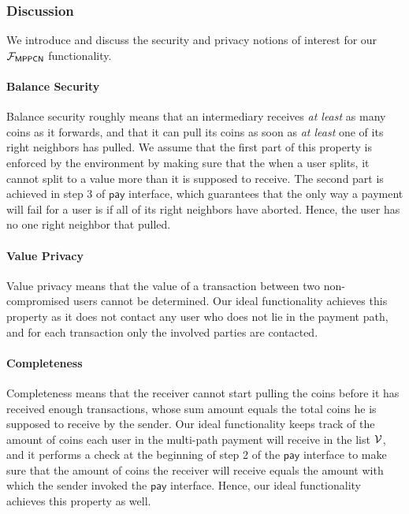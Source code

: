 \subsubsection{Discussion}
\label{sec:mppcn-discussion}

We introduce and discuss the security and privacy notions of interest for our 
$\mathcal{F}_{\mathsf{MPPCN}}$ functionality.

\paragraph{Balance Security}
Balance security roughly means that an intermediary receives \emph{at least} as many coins as 
it forwards, and that it can pull its coins as soon as \emph{at least} one of its right 
neighbors has pulled. We assume that the first part of this property is enforced by the 
environment by making sure that the when a user splits, it cannot split to a value more than it 
is supposed to receive.  The second part is achieved 
in step 3 of $\mathsf{pay}$ interface, which guarantees that the only way a payment will fail 
for a user is if all of its right neighbors have aborted. Hence, the user has no one right 
neighbor that pulled.

\paragraph{Value Privacy}
Value privacy means that the value of a transaction between two non-compromised users cannot 
be determined. Our ideal functionality achieves this property as it does not contact any user 
who does not lie in the payment path, and for each transaction only the involved parties are 
contacted. 


\paragraph{Completeness}
Completeness means that the receiver cannot start pulling the coins before it has received 
enough transactions, whose sum amount equals the total coins he is supposed to receive by 
the sender. Our ideal functionality keeps track of the amount of coins each user in the 
multi-path payment will receive in the list $\mathcal{V}$, and it performs a check at the beginning of 
step 2 of the $\mathsf{pay}$ interface to make sure that the amount of coins the receiver will 
receive equals the amount with which the sender invoked the $\mathsf{pay}$ interface. Hence, our 
ideal functionality achieves this property as well.

